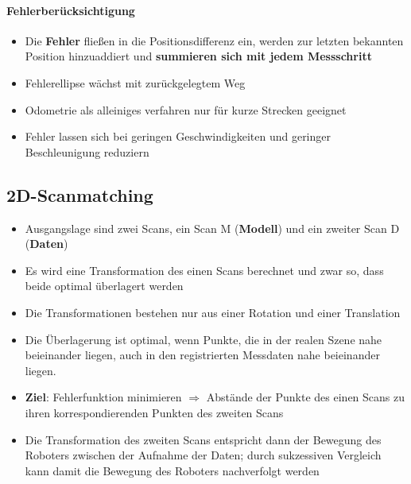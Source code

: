 \paragraph{Fehlerberücksichtigung}
\begin{itemize}
	\item Die \textbf{Fehler} fließen in die Positionsdifferenz ein, werden zur letzten bekannten Position hinzuaddiert und \textbf{summieren sich mit jedem Messschritt}
	\item Fehlerellipse wächst mit zurückgelegtem Weg
	\item Odometrie als alleiniges verfahren nur für kurze Strecken geeignet
	\item Fehler lassen sich bei geringen Geschwindigkeiten und geringer Beschleunigung reduziern
\end{itemize}
\subsection{2D-Scanmatching}
\begin{itemize}
	\item Ausgangslage sind zwei Scans, ein Scan M (\textbf{Modell}) und ein zweiter Scan D (\textbf{Daten})
	\item Es wird eine Transformation des einen Scans berechnet und zwar so, dass beide optimal überlagert werden
	\item Die Transformationen bestehen nur aus einer Rotation und einer Translation
	\item Die Überlagerung ist optimal, wenn Punkte, die in der realen Szene nahe beieinander liegen, auch in den registrierten Messdaten nahe beieinander liegen.
	\item \textbf{Ziel}: Fehlerfunktion minimieren $\Rightarrow$ Abstände der Punkte des einen Scans zu ihren korrespondierenden Punkten des zweiten Scans
	\item Die Transformation des zweiten Scans entspricht dann der Bewegung des Roboters zwischen der Aufnahme der Daten; durch sukzessiven Vergleich kann damit die Bewegung des Roboters nachverfolgt werden
\end{itemize}
